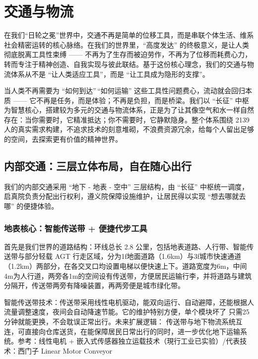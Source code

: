 ﻿\chapter{交通与物流}\label{ux4ea4ux901aux4e0eux7269ux6d41}

在我们``日轮之冕''世界中，交通不再是简单的位移工具，而是串联个体生活、维系社会精密运转的核心脉络。在我们的世界里，``高度发达'' 的终极意义，是让人类彻底脱离工具性束缚 ------ 不再为了生存而被迫劳作，不再为了位移而耗费心力，转而专注于精神创造、自我实现与彼此联结。基于这份核心理念，我们的交通与物流体系从不是 ``让人类适应工具''，而是 ``让工具成为隐形的支撑''。

当人类不再需要为 ``如何到达''\,``如何运输'' 这些工具性问题费心，流动就会回归本质 ------ 它不再是任务，而是体验；不再是负担，而是桥梁。我们以 ``长征'' 中枢为智慧核心，搭建较为多元的交通与物流体系，正是为了让其像空气和水一样自然存在：当你需要时，它精准抵达；你不需要时，它静默隐身。整个体系围绕 2139 人的真实需求构建，不追求技术的刻意堆砌，不浪费资源冗余，给每个人留出足够的空间，去探索更有价值的精神世界。

\section{内部交通：三层立体布局，自在随心出行}\label{ux5185ux90e8ux4ea4ux901aux4e09ux5c42ux7acbux4f53ux5e03ux5c40ux81eaux5728ux968fux5fc3ux51faux884c}

我们的内部交通采用 ``地下 - 地表 - 空中'' 三层结构，由 ``长征'' 中枢统一调度，启真院负责分配出行权利，遵义院保障设施维护，让居民得以实现 ``想去哪就去哪'' 的便捷体验。

\subsection{地表核心：智能传送带 + 便捷代步工具}\label{ux5730ux8868ux6838ux5fc3ux667aux80fdux4f20ux9001ux5e26-ux4fbfux6377ux4ee3ux6b65ux5de5ux5177}

首先是我们世界的道路结构：环线总长 2.8 公里，包括地表道路、人行带、智能传送带与部分轻载 AGT 行走区域，分为1f地面道路（1.6km）与3f城市快速通道（1.2km）两部分，在各交叉口均设置电梯以便快速上下。道路宽度为6m，中间4m为人行道，两旁各1m的空间设有传送带，方便居民运输行李，并将道路与建筑分隔开，传送带两旁有降噪装置，再两旁便是城市绿化带。

智能传送带技术：传送带采用线性电机驱动，能双向运行、自动避障，还能根据人流量调整速度，夜间会自动降速节能。它的维护特别方便，单个模块坏了 只需25 分钟就能更换，不会耽误正常出行。未来扩展逻辑： 传送带与地下物流系统互连，可直接向仓库送货，在能保障居民日常出行的同时，进一步优化地下运输系统。参考：线性电机 + 嵌入式传感器独立运载技术（現行工业已实验）/代表技术：西门子 Linear Motor Conveyor

